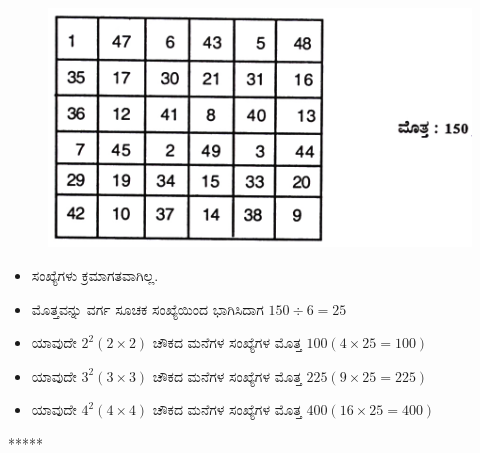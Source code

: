 \begin{figure}[H]
\includegraphics{src/figures/chap11/fig11-5.jpg}
\end{figure}
\begin{itemize}
	\item ಸಂಖ್ಯೆಗಳು ಕ್ರಮಾಗತವಾಗಿಲ್ಲ.
	\item ಮೊತ್ತವನ್ನು ವರ್ಗ ಸೂಚಕ ಸಂಖ್ಯೆಯಿಂದ ಭಾಗಿಸಿದಾಗ $150 \div 6  = 25$
	\item ಯಾವುದೇ $2^2 (2 \times 2)$ ಚೌಕದ ಮನೆಗಳ ಸಂಖ್ಯೆಗಳ ಮೊತ್ತ $100 (4 \times 25 = 100)$
	\item ಯಾವುದೇ $3^2 (3 \times 3)$ ಚೌಕದ ಮನೆಗಳ ಸಂಖ್ಯೆಗಳ ಮೊತ್ತ $225 (9 \times 25 = 225)$
	\item ಯಾವುದೇ $4^2 (4 \times 4)$ ಚೌಕದ ಮನೆಗಳ ಸಂಖ್ಯೆಗಳ ಮೊತ್ತ $400 (16 \times 25 = 400)$
\end{itemize}
\begin{center}
*****
\end{center}
